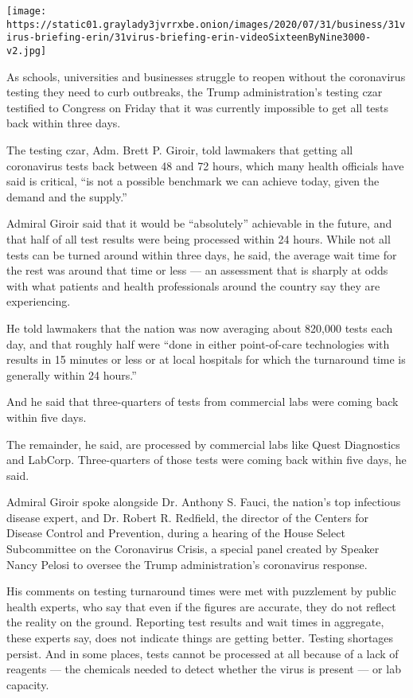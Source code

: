 \texttt{[image: https://static01.graylady3jvrrxbe.onion/images/2020/07/31/business/31virus-briefing-erin/31virus-briefing-erin-videoSixteenByNine3000-v2.jpg]}

As schools, universities and businesses struggle to reopen without the
coronavirus testing they need to curb outbreaks, the Trump
administration's testing czar testified to Congress on Friday that it
was currently impossible to get all tests back within three days.

The testing czar, Adm. Brett P. Giroir, told lawmakers that getting all
coronavirus tests back between 48 and 72 hours, which many health
officials have said is critical, ``is not a possible benchmark we can
achieve today, given the demand and the supply.''

Admiral Giroir said that it would be ``absolutely'' achievable in the
future, and that half of all test results were being processed within 24
hours. While not all tests can be turned around within three days, he
said, the average wait time for the rest was around that time or less
--- an assessment that is sharply at odds with what patients and health
professionals around the country say they are experiencing.

He told lawmakers that the nation was now averaging about 820,000 tests
each day, and that roughly half were ``done in either point-of-care
technologies with results in 15 minutes or less or at local hospitals
for which the turnaround time is generally within 24 hours.''

And he said that three-quarters of tests from commercial labs were
coming back within five days.

The remainder, he said, are processed by commercial labs like Quest
Diagnostics and LabCorp. Three-quarters of those tests were coming back
within five days, he said.

Admiral Giroir spoke alongside Dr. Anthony S. Fauci, the nation's top
infectious disease expert, and Dr. Robert R. Redfield, the director of
the Centers for Disease Control and Prevention, during a hearing of the
House Select Subcommittee on the Coronavirus Crisis, a special panel
created by Speaker Nancy Pelosi to oversee the Trump administration's
coronavirus response.

His comments on testing turnaround times were met with puzzlement by
public health experts, who say that even if the figures are accurate,
they do not reflect the reality on the ground. Reporting test results
and wait times in aggregate, these experts say, does not indicate things
are getting better. Testing shortages persist. And in some places, tests
cannot be processed at all because of a lack of reagents --- the
chemicals needed to detect whether the virus is present --- or lab
capacity.

